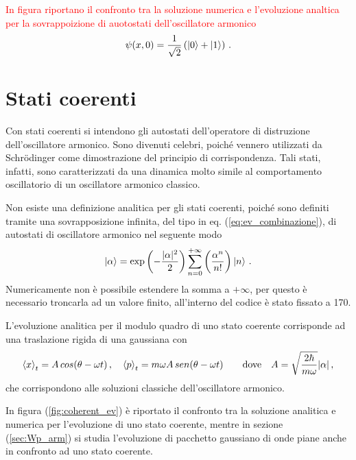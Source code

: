 \textcolor{red}{ In figura %
riportano il confronto tra la soluzione numerica e l'evoluzione analtica per la sovrappoizione di auotostati dell'oscillatore armonico
\begin{equation}
    \centering
    \psi(x, 0) = \frac{1}{\sqrt{2}} \left( \ket{0} + \ket{1} \right)   \, \text{.}
    \label{eq:superpos}
\end{equation} 
}

\section{Stati coerenti}
\label{sec:coherent}

Con stati coerenti \cite{CT:QM} si intendono gli autostati dell'operatore di distruzione dell'oscillatore armonico. Sono divenuti celebri, poiché vennero utilizzati da Schr\"odinger come dimostrazione del principio di corrispondenza. Tali stati, infatti, sono caratterizzati da una dinamica molto simile al comportamento oscillatorio di un oscillatore armonico classico. 

Non esiste una definizione analitica per gli stati coerenti, poiché sono definiti tramite una sovrapposizione infinita, del tipo in eq. (\ref{eq:ev_combinazione}), di autostati di oscillatore armonico nel seguente modo
\begin{equation}
    \centering
    \ket{\alpha} = \exp \left(- \frac{|\alpha|^2}{2}\right) \sum_{n=0}^{+ \infty} \left( \frac{\alpha^n}{n!} \right) \ket{n} \, \text{.}
    \label{eq:def_coherent}
\end{equation} 
Numericamente non è possibile estendere la somma a $+\infty$, per questo è necessario troncarla ad un valore finito, all'interno del codice è stato fissato a 170.

L'evoluzione analitica per il modulo quadro di uno stato coerente corrisponde ad una traslazione rigida di una gaussiana con 
\begin{equation}
    \centering
    \expval{x}_{t} = A \, cos(\theta - \omega t) \, \text{,} \quad
    \expval{p}_{t} = m \omega A \, sen(\theta - \omega t) \qquad
    \text{dove} \quad A = \sqrt{\frac{2 \hbar}{m \omega}} |\alpha| \, \text{,}
    \label{eq:coherent_an}
\end{equation}
che corrispondono alle soluzioni classiche dell'oscillatore armonico.

In figura (\ref{fig:coherent_ev}) è riportato il confronto tra la soluzione analitica e numerica per l'evoluzione di uno stato coerente, mentre in sezione (\ref{sec:Wp_arm}) si studia l'evoluzione di pacchetto gaussiano di onde piane anche in confronto ad uno stato coerente.


